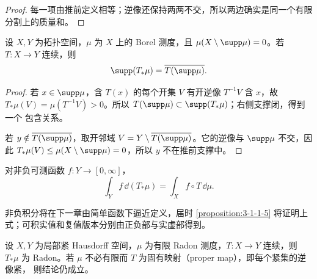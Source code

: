 \begin{proof}
每一项由推前定义相等；逆像还保持两两不交，所以两边确实是同一个有限分割上的质量和。
\end{proof}

\begin{proposition}[连续推前与支撑]\label{proposition:2-3-1-1b}
设 $X,Y$ 为拓扑空间，$\mu$ 为 $X$ 上的 Borel 测度，且
$\mu(X\setminus\supp\mu)=0$。若 $T:X\to Y$ 连续，则
\[
 \supp(T_*\mu)=\overline{T(\supp\mu)}.
\]
\end{proposition}

\begin{proof}
若 $x\in\supp\mu$，含 $T(x)$ 的每个开集 $V$ 有开逆像 $T^{-1}V$ 含 $x$，故
$T_*\mu(V)=\mu(T^{-1}V)>0$。所以 $T(\supp\mu)\subset\supp(T_*\mu)$；右侧支撑闭，得到一个
包含关系。

若 $y\notin\overline{T(\supp\mu)}$，取开邻域
$V=Y\setminus\overline{T(\supp\mu)}$。它的逆像与 $\supp\mu$ 不交，因此
$T_*\mu(V)\le\mu(X\setminus\supp\mu)=0$，所以 $y$ 不在推前支撑中。
\end{proof}

\begin{theorem}[推前积分公式]\label{theorem:2-3-1-2}
对非负可测函数 $f:Y\to[0,\infty]$，
\[
 \int_Y f\,\dd(T_*\mu)=\int_Xf\circ T\,\dd\mu.
\]
\end{theorem}

非负积分将在下一章由简单函数下逼近定义，届时
\cref{proposition:3-1-1-5} 将证明上式；可积实值和复值版本分别由正负部与实虚部得到。

\begin{proposition}\label{proposition:2-3-1-3}
设 $X,Y$ 为局部紧 Hausdorff 空间，$\mu$ 为有限 Radon 测度，$T:X\to Y$ 连续，则
$T_*\mu$ 为 Radon。若 $\mu$ 不必有限而 $T$ 为固有映射（proper map），即每个紧集的逆像紧，
则结论仍成立。
\end{proposition}

